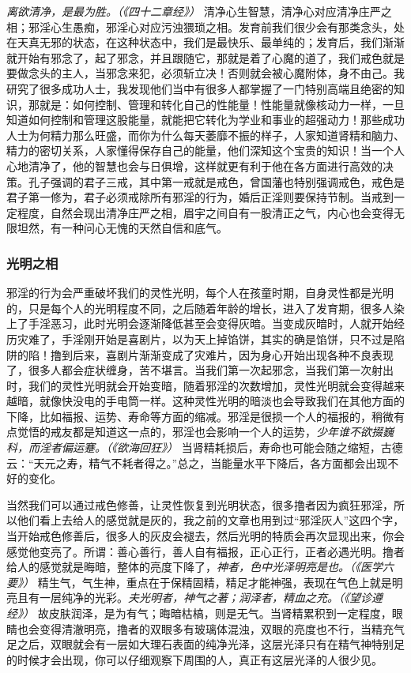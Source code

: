 \textit{离欲清净，是最为胜。（《四十二章经》）} 清净心生智慧，清净心对应清净庄严之相；邪淫心生愚痴，邪淫心对应污浊猥琐之相。发育前我们很少会有那类念头，处在天真无邪的状态，在这种状态中，我们是最快乐、最单纯的；发育后，我们渐渐就开始有邪念了，起了邪念，并且跟随它，那就是着了心魔的道了，我们戒色就是要做念头的主人，当邪念来犯，必须斩立决！否则就会被心魔附体，身不由己。我研究了很多成功人士，我发现他们当中有很多人都掌握了一门特别高端且绝密的知识，那就是：如何控制、管理和转化自己的性能量！性能量就像核动力一样，一旦知道如何控制和管理这股能量，就能把它转化为学业和事业的超强动力！那些成功人士为何精力那么旺盛，而你为什么每天萎靡不振的样子，人家知道肾精和脑力、精力的密切关系，人家懂得保存自己的能量，他们深知这个宝贵的知识！当一个人心地清净了，他的智慧也会与日俱增，这样就更有利于他在各方面进行高效的决策。孔子强调的君子三戒，其中第一戒就是戒色，曾国藩也特别强调戒色，戒色是君子第一修为，君子必须戒除所有邪淫的行为，婚后正淫则要保持节制。当戒到一定程度，自然会现出清净庄严之相，眉宇之间自有一股清正之气，内心也会变得无限坦然，有一种问心无愧的天然自信和底气。

\subsubsection{光明之相}

邪淫的行为会严重破坏我们的灵性光明，每个人在孩童时期，自身灵性都是光明的，只是每个人的光明程度不同，之后随着年龄的增长，进入了发育期，很多人染上了手淫恶习，此时光明会逐渐降低甚至会变得灰暗。当变成灰暗时，人就开始经历灾难了，手淫刚开始是喜剧片，以为天上掉馅饼，其实的确是馅饼，只不过是陷阱的陷！撸到后来，喜剧片渐渐变成了灾难片，因为身心开始出现各种不良表现了，很多人都会症状缠身，苦不堪言。当我们第一次起邪念，当我们第一次射出时，我们的灵性光明就会开始变暗，随着邪淫的次数增加，灵性光明就会变得越来越暗，就像快没电的手电筒一样。这种灵性光明的暗淡也会导致我们在其他方面的下降，比如福报、运势、寿命等方面的缩减。邪淫是很损一个人的福报的，稍微有点觉悟的戒友都是知道这一点的，邪淫也会影响一个人的运势，\textit{少年谁不欲掇巍科，而淫者偏运蹇。（《欲海回狂》）} 当肾精耗损后，寿命也可能会随之缩短，古德云：“天元之寿，精气不耗者得之。”总之，当能量水平下降后，各方面都会出现不好的变化。

当然我们可以通过戒色修善，让灵性恢复到光明状态，很多撸者因为疯狂邪淫，所以他们看上去给人的感觉就是灰的，我之前的文章也用到过“邪淫灰人”这四个字，当开始戒色修善后，很多人的灰皮会褪去，然后光明的特质会再次显现出来，你会感觉他变亮了。所谓：善心善行，善人自有福报，正心正行，正者必遇光明。撸者给人的感觉就是晦暗，整体的亮度下降了，\textit{神者，色中光泽明亮是也。（《医学六要》）} 精生气，气生神，重点在于保精固精，精足才能神强，表现在气色上就是明亮且有一层纯净的光彩。\textit{夫光明者，神气之著；润泽者，精血之充。（《望诊遵经》）} 故皮肤润泽，是为有气；晦暗枯槁，则是无气。当肾精累积到一定程度，眼睛也会变得清澈明亮，撸者的双眼多有玻璃体混浊，双眼的亮度也不行，当精充气足之后，双眼就会有一层如大理石表面的纯净光泽，这层光泽只有在精气神特别足的时候才会出现，你可以仔细观察下周围的人，真正有这层光泽的人很少见。

